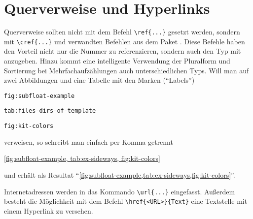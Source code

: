 \section{Querverweise und Hyperlinks}%
\label{sec:Querverweise}
%
Querverweise sollten nicht mit dem Befehl \verb#\ref{...}# gesetzt werden,
sondern mit \verb#\cref{...}# und verwandten Befehlen aus dem Paket
 \cite{Cubitt2013}.
Diese Befehle haben den Vorteil nicht nur die Nummer zu referenzieren,
sondern auch den Typ mit anzugeben.
Hinzu kommt eine intelligente Verwendung der Pluralform und
Sortierung bei Mehrfachaufzählungen auch unterschiedlichen Typs.
Will man \bspw auf zwei Abbildungen und eine Tabelle mit den Marken (\enquote{Labels})
%
\begin{itemize*}
\item \texttt{fig:subfloat-example}
\item \texttt{tab:files-dirs-of-template}
\item \texttt{fig:kit-colors}
\end{itemize*}
%
verweisen, so schreibt man einfach per Komma getrennt
%
\begin{latex}[caption={Cleveres Referenzieren mit \bs cref},label={lst:cref}]
\cref{fig:subfloat-example,
      tab:ex-sideways,
      fig:kit-colors}
\end{latex}
%
und erhält als Resultat
\enquote{\cref{fig:subfloat-example,tab:ex-sideways,fig:kit-colors}}.

Internetadressen werden in das Kommando \lstinline|\url{...}| eingefasst.
Außerdem besteht die Möglichkeit mit dem Befehl \lstinline|\href{<URL>}{Text}| eine Textstelle mit einem Hyperlink zu versehen.
